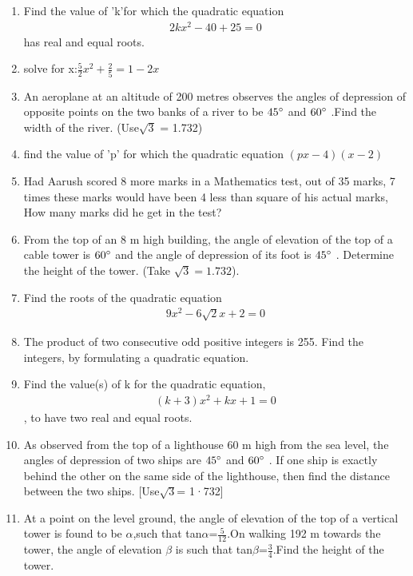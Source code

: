 \documentclass{article}
\begin{document}
\begin{enumerate}
 \item Find the value of 'k'for which the quadratic equation 
     \begin{align}
         2kx^2-40+25=0
     \end{align} has real and equal roots.
     \item solve for x:$\frac{5}{2}x^2+\frac{2}{5}=1-2x$
     \item An aeroplane at an altitude of 200 metres observes the angles of depression of opposite points on the two banks of a river to be $45\degree$ and $60\degree$ .Find the width of the river. (Use$\sqrt{3}$ = 1.732)
     \item find the value of 'p' for which the quadratic equation $(px-4) (x-2)$
     \item Had Aarush scored 8 more marks in a Mathematics test, out of 35 marks, 7 times these marks would have been 4 less than square of his actual marks, How many marks did he get in the test?
     \item From the top of an 8 m high building, the angle of elevation of the top of a cable tower is $60\degree$ and the angle of depression of its foot is $45\degree$  . Determine the height of the tower. (Take $\sqrt{3} = 1.732$).
     \item Find the roots of the quadratic equation 
     \begin{align}
         9x^2-6\sqrt{2}x+2=0
         \end{align}
         \item The product of two consecutive odd positive integers is 255. Find the integers, by formulating a quadratic equation.
         \item Find the value(s) of k for the quadratic equation,
         \begin{align}
             (k+3)x^2+kx+1=0 
         \end{align} , to have two real and equal roots.
         \item As observed from the top of a lighthouse 60 m high from the sea level, the angles of depression of two ships are $45\degree$ and $60\degree$ . If one ship is exactly behind the other on the same side of the lighthouse, then find the distance between the two ships. [Use$\sqrt{3}$= 1·732]
         \item At a point on the level ground, the angle of elevation of the top of a vertical tower is found to be $\alpha$,such that tan$\alpha$=$\frac{5}{12}$.On walking 192 m towards the tower, the angle of elevation $\beta$ is such that tan$\beta$=$\frac{3}{4}$.Find the height of the tower. 

\end{enumerate}
\end{document}

